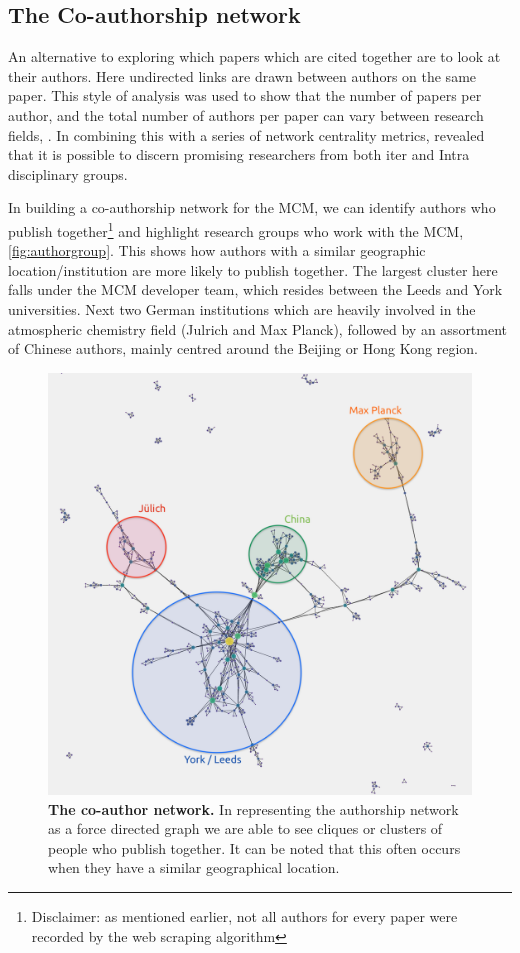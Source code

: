 \subsection{The Co-authorship network}
An alternative to exploring which papers which are cited together are to look at their authors. Here undirected links are drawn between authors on the same paper. This style of analysis was used to show that the number of papers per author, and the total number of authors per paper can vary between research fields, \citep{newmancoauthor}. In combining this with a series of network centrality metrics, \citep{coauthornew} revealed that it is possible to discern promising researchers from both iter and Intra disciplinary groups. 

In building a co-authorship network for the MCM, we can identify authors who publish together\footnote{ Disclaimer: as mentioned earlier, not all authors for every paper were recorded by the web scraping algorithm} and highlight research groups who work with the MCM, \autoref{fig:authorgroup}. This shows how authors with a similar geographic location/institution are more likely to publish together. The largest cluster here falls under the MCM developer team, which resides between the Leeds and York universities. Next two German institutions which are heavily involved in the atmospheric chemistry field (Julrich and Max Planck), followed by an assortment of Chinese authors, mainly centred around the Beijing or Hong Kong region. 


\begin{figure}[H]
     \centering
         \includegraphics[width=.8\textwidth]{figures_c3/GroupAuthor.png}
        \caption{ \textbf{The co-author network.} In representing the authorship network as a force directed graph we are able to see cliques or clusters of people who publish together. It can be noted that this often occurs when they have a similar geographical location.}
        \label{fig:authorgroup}
\end{figure}





